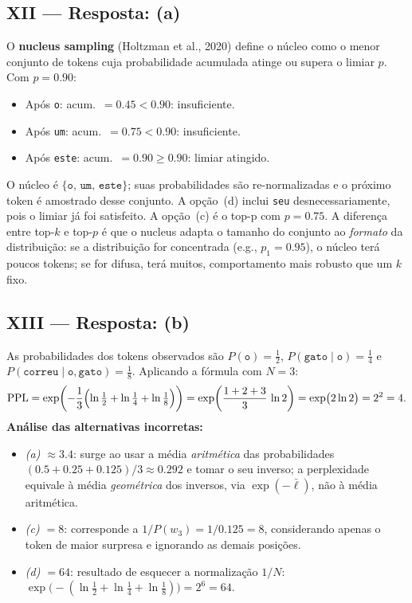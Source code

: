 \documentclass{dlproblemset}
\begin{document}
\subsection*{XII — Resposta: (a)}
O \textbf{nucleus sampling} (Holtzman et al., 2020) define o núcleo como o menor
conjunto de tokens cuja probabilidade acumulada atinge ou supera o limiar $p$.
Com $p = 0.90$:
\begin{itemize}
  \item Após \texttt{o}: acum.\ $= 0.45 < 0.90$: insuficiente.
  \item Após \texttt{um}: acum.\ $= 0.75 < 0.90$: insuficiente.
  \item Após \texttt{este}: acum.\ $= 0.90 \ge 0.90$: limiar atingido.
\end{itemize}
O núcleo é $\{\texttt{o},\,\texttt{um},\,\texttt{este}\}$; suas probabilidades são
re-normalizadas e o próximo token é amostrado desse conjunto. A opção~(d) inclui
\texttt{seu} desnecessariamente, pois o limiar já foi satisfeito. A opção~(c) é o
top-p com $p{=}0.75$. A diferença entre top-$k$ e top-$p$ é que o nucleus
adapta o tamanho do conjunto ao \emph{formato} da distribuição: se a distribuição
for concentrada (e.g., $p_1 = 0.95$), o núcleo terá poucos tokens; se for difusa,
terá muitos, comportamento mais robusto que um $k$ fixo.

\subsection*{XIII — Resposta: (b)}
As probabilidades dos tokens observados são
$P(\texttt{o}) = \tfrac{1}{2}$,\;
$P(\texttt{gato}\mid\texttt{o}) = \tfrac{1}{4}$ e
$P(\texttt{correu}\mid\texttt{o},\texttt{gato}) = \tfrac{1}{8}$.
Aplicando a fórmula com $N = 3$:
\[
  \mathrm{PPL}
    = \exp\!\left(-\frac{1}{3}\Bigl(
        \ln\tfrac{1}{2} + \ln\tfrac{1}{4} + \ln\tfrac{1}{8}
      \Bigr)\right)
    = \exp\!\left(\frac{1 + 2 + 3}{3}\,\ln 2\right)
    = \exp\bigl(2\ln 2\bigr)
    = 2^2 = 4.
\]
\textbf{Análise das alternativas incorretas:}
\begin{itemize}
  \item \emph{(a) $\approx 3.4$}: surge ao usar a média \emph{aritmética}
        das probabilidades $(0.5 + 0.25 + 0.125)/3 \approx 0.292$
        e tomar o seu inverso; a perplexidade equivale à média
        \emph{geométrica} dos inversos, via $\exp(-\bar{\ell})$,
        não à média aritmética.
  \item \emph{(c) $= 8$}: corresponde a $1/P(w_3) = 1/0.125 = 8$,
        considerando apenas o token de maior surpresa e ignorando as
        demais posições.
  \item \emph{(d) $= 64$}: resultado de esquecer a normalização $1/N$:
        $\exp\!\bigl(-(\ln\tfrac{1}{2}+\ln\tfrac{1}{4}+\ln\tfrac{1}{8})\bigr)
        = 2^6 = 64$.
\end{itemize}
\end{document}
